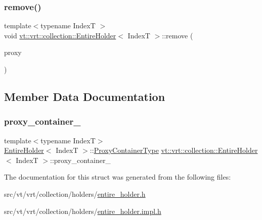 \mbox{\label{structvt_1_1vrt_1_1collection_1_1_entire_holder_ad505d79024df92c9dc36a5debd3875ec}} 
\subsubsection{\texorpdfstring{remove()}{remove()}}
{\footnotesize\ttfamily template$<$typename IndexT $>$ \\
void \hyperlink{structvt_1_1vrt_1_1collection_1_1_entire_holder}{vt\+::vrt\+::collection\+::\+Entire\+Holder}$<$ IndexT $>$\+::remove (\begin{DoxyParamCaption}\item[{\hyperlink{namespacevt_a1b417dd5d684f045bb58a0ede70045ac}{Virtual\+Proxy\+Type} const \&}]{proxy }\end{DoxyParamCaption})\hspace{0.3cm}{\ttfamily [static]}}



\subsection{Member Data Documentation}
\mbox{\label{structvt_1_1vrt_1_1collection_1_1_entire_holder_aa331cf7551bcc334e1b7a85700cc5d49}} 
\subsubsection{\texorpdfstring{proxy\+\_\+container\+\_\+}{proxy\_container\_}}
{\footnotesize\ttfamily template$<$typename IndexT$>$ \\
\hyperlink{structvt_1_1vrt_1_1collection_1_1_entire_holder}{Entire\+Holder}$<$ IndexT $>$\+::\hyperlink{structvt_1_1vrt_1_1collection_1_1_entire_holder_a8d1ceab08d81edb0d45f48ee84a05eea}{Proxy\+Container\+Type} \hyperlink{structvt_1_1vrt_1_1collection_1_1_entire_holder}{vt\+::vrt\+::collection\+::\+Entire\+Holder}$<$ IndexT $>$\+::proxy\+\_\+container\+\_\+\hspace{0.3cm}{\ttfamily [static]}}



The documentation for this struct was generated from the following files\+:\begin{DoxyCompactItemize}
\item 
src/vt/vrt/collection/holders/\hyperlink{entire__holder_8h}{entire\+\_\+holder.\+h}\item 
src/vt/vrt/collection/holders/\hyperlink{entire__holder_8impl_8h}{entire\+\_\+holder.\+impl.\+h}\end{DoxyCompactItemize}
